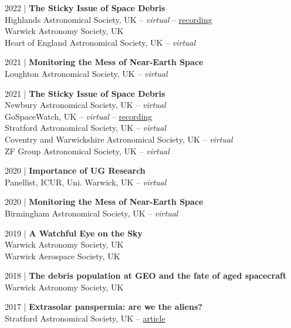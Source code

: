 \documentclass[10pt,a4paper]{altacv}
\begin{document}
\smallskip

\small 2022 | \textbf{The Sticky Issue of Space Debris} \\
Highlands Astronomical Society, UK -- \textit{virtual} -- \href{https://youtu.be/WMC-LWQ0q7o}{recording} \\
Warwick Astronomy Society, UK \\
Heart of England Astronomical Society, UK -- \textit{virtual}

\smallskip

\small 2021 | \textbf{Monitoring the Mess of Near-Earth Space} \\
Loughton Astronomical Society, UK -- \textit{virtual}

\smallskip

\small 2021 | \textbf{The Sticky Issue of Space Debris} \\
Newbury Astronomical Society, UK -- \textit{virtual} \\
GoSpaceWatch, UK -- \textit{virtual} -- \href{https://youtu.be/wAq95oAaCMI?si=AYPChm5JbJ4IdLt3}{recording} \\
Stratford Astronomical Society, UK -- \textit{virtual} \\
Coventry and Warwickshire Astronomical Society, UK -- \textit{virtual} \\
ZF Group Astronomical Society, UK -- \textit{virtual}

\smallskip

\small 2020 | \textbf{Importance of UG Research} \\
Panellist, ICUR, Uni. Warwick, UK -- \textit{virtual}

\smallskip

\small 2020 | \textbf{Monitoring the Mess of Near-Earth Space} \\
Birmingham Astronomical Society, UK -- \textit{virtual}

\smallskip

\small 2019 | \textbf{A Watchful Eye on the Sky} \\
Warwick Astronomy Society, UK \\
Warwick Aerospace Society, UK 

\smallskip

\small 2018 | \textbf{The debris population at GEO and the fate of aged spacecraft} \\
Warwick Astronomy Society, UK

\smallskip

\small 2017 | \textbf{Extrasolar panspermia: are we the aliens?} \\
Stratford Astronomical Society, UK -- \href{http://www.astro.org.uk/news/nov17/}{article}
\end{document}
